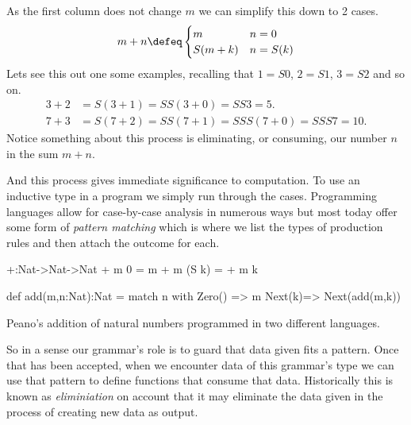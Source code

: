 As the first column does not change $m$ we can simplify this down to 2 cases.
\begin{align*}
    m+n \defeq \begin{cases} m & n=0\\ S(m+k) & n=S(k)\end{cases}
\end{align*}
Lets see this out one some examples, recalling that $1=S0$, $2=S1$, $3=S2$ and so on.
\begin{align*}
    3+2 & = S(3+1)= SS(3+0) = SS3=5.\\
    7+3 & = S(7+2) = SS(7+1) = SSS(7+0)=SSS7=10.
\end{align*}
Notice something about this process is eliminating, or consuming, 
our number $n$ in the sum $m+n$.  

And this process gives immediate significance to computation.
To use an inductive type in a program we simply run through the cases.
Programming languages allow for case-by-case analysis in numerous ways 
but most today offer some form of \emph{pattern matching} which is 
where we list the types of production rules and then attach the outcome 
for each.
\begin{lstfloat}
\begin{center}
\begin{minipage}{0.4\textwidth}
\begin{Fcode}[]
+:Nat->Nat->Nat
+ m  0    = m
+ m (S k) = + m k
\end{Fcode}
\end{minipage}
\hfill
\begin{minipage}{0.59\textwidth}
\begin{Pcode}[]
def add(m,n:Nat):Nat =
  match n with 
    Zero() => m
    Next(k)=> Next(add(m,k))
\end{Pcode}
\end{minipage}
\end{center}
\caption{Peano's addition of natural numbers programmed in two different languages.}
\label{lst:peano}
\end{lstfloat}


So in a sense our grammar's role is to guard that data given fits 
a pattern.  Once that has been accepted, when we encounter data 
of this grammar's type we can use that pattern to define functions 
that consume that data.  Historically this is known as \emph{eliminiation}
on account that it may eliminate the data given in the process of 
creating new data as output.

